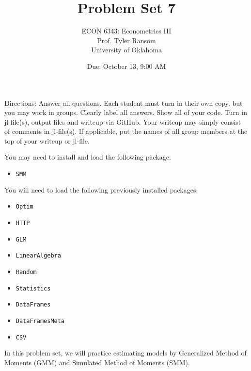 \documentclass[12pt,english]{article}
\begin{document}
\title{Problem Set 7}
\author{ECON 6343: Econometrics III\\
Prof. Tyler Ransom\\
University of Oklahoma}
\date{Due: October 13, 9:00 AM}

\maketitle
Directions: Answer all questions. Each student must turn in their own copy, but you may work in groups. Clearly label all answers. Show all of your code. Turn in jl-file(s), output files and writeup via GitHub. Your writeup may simply consist of comments in jl-file(s). If applicable, put the names of all group members at the top of your writeup or jl-file.

You may need to install and load the following package:
\begin{itemize}
 \item[~] \texttt{SMM}
\end{itemize}

You will need to load the following previously installed packages:
\begin{itemize}
    \item[~] \texttt{Optim} 
    \item[~] \texttt{HTTP} 
    \item[~] \texttt{GLM} 
    \item[~] \texttt{LinearAlgebra} 
    \item[~] \texttt{Random} 
    \item[~] \texttt{Statistics} 
    \item[~] \texttt{DataFrames} 
    \item[~] \texttt{DataFramesMeta} 
    \item[~] \texttt{CSV} 
\end{itemize}
\pagebreak
In this problem set, we will practice estimating models by Generalized Method of Moments (GMM) and Simulated Method of Moments (SMM).
\end{document}
